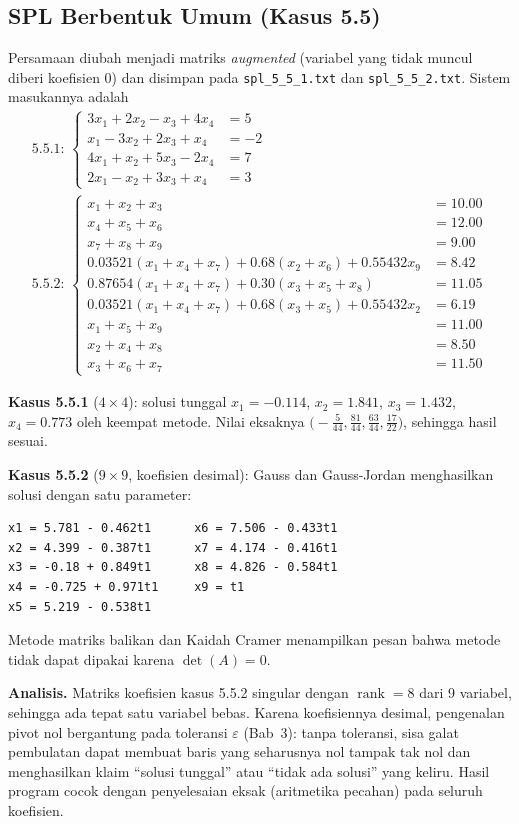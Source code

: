 \documentclass[12pt,a4paper]{article}
\begin{document}
\subsection{SPL Berbentuk Umum (Kasus 5.5)}
Persamaan diubah menjadi matriks \textit{augmented} (variabel yang tidak muncul diberi koefisien 0) dan disimpan pada \texttt{spl\_5\_5\_1.txt} dan \texttt{spl\_5\_5\_2.txt}. Sistem masukannya adalah
\begin{gather*}
\text{5.5.1: }\left\{\begin{aligned}
3x_1+2x_2-x_3+4x_4&=5\\
x_1-3x_2+2x_3+x_4&=-2\\
4x_1+x_2+5x_3-2x_4&=7\\
2x_1-x_2+3x_3+x_4&=3
\end{aligned}\right.
\\[6pt]
\text{5.5.2: }\left\{\begin{aligned}
x_1+x_2+x_3&=10.00\\
x_4+x_5+x_6&=12.00\\
x_7+x_8+x_9&=9.00\\
0.03521(x_1+x_4+x_7)+0.68(x_2+x_6)+0.55432x_9&=8.42\\
0.87654(x_1+x_4+x_7)+0.30(x_3+x_5+x_8)&=11.05\\
0.03521(x_1+x_4+x_7)+0.68(x_3+x_5)+0.55432x_2&=6.19\\
x_1+x_5+x_9&=11.00\\
x_2+x_4+x_8&=8.50\\
x_3+x_6+x_7&=11.50
\end{aligned}\right.
\end{gather*}

\textbf{Kasus 5.5.1} ($4\times4$): solusi tunggal $x_1=-0.114$, $x_2=1.841$, $x_3=1.432$, $x_4=0.773$ oleh keempat metode. Nilai eksaknya $\bigl(-\tfrac5{44},\tfrac{81}{44},\tfrac{63}{44},\tfrac{17}{22}\bigr)$, sehingga hasil sesuai.

\textbf{Kasus 5.5.2} ($9\times9$, koefisien desimal): Gauss dan Gauss-Jordan menghasilkan solusi dengan satu parameter:
\begin{lstlisting}
x1 = 5.781 - 0.462t1      x6 = 7.506 - 0.433t1
x2 = 4.399 - 0.387t1      x7 = 4.174 - 0.416t1
x3 = -0.18 + 0.849t1      x8 = 4.826 - 0.584t1
x4 = -0.725 + 0.971t1     x9 = t1
x5 = 5.219 - 0.538t1
\end{lstlisting}
Metode matriks balikan dan Kaidah Cramer menampilkan pesan bahwa metode tidak dapat dipakai karena $\det(A)=0$.

\textbf{Analisis.} Matriks koefisien kasus 5.5.2 singular dengan $\operatorname{rank}=8$ dari 9 variabel, sehingga ada tepat satu variabel bebas. Karena koefisiennya desimal, pengenalan pivot nol bergantung pada toleransi $\varepsilon$ (Bab~3): tanpa toleransi, sisa galat pembulatan dapat membuat baris yang seharusnya nol tampak tak nol dan menghasilkan klaim ``solusi tunggal'' atau ``tidak ada solusi'' yang keliru. Hasil program cocok dengan penyelesaian eksak (aritmetika pecahan) pada seluruh koefisien.
\end{document}
